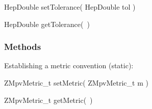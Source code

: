 \begin{shortlist}
  \item HepDouble setTolerance( HepDouble tol )
  \item HepDouble getTolerance(~)
\end{shortlist}

\subsubsection{Methods}

\noindent
Establishing a metric convention (static):

\begin{shortlist}
  \item ZMpvMetric\_t setMetric( ZMpvMetric\_t m )
  \item ZMpvMetric\_t getMetric(~)
\end{shortlist}


